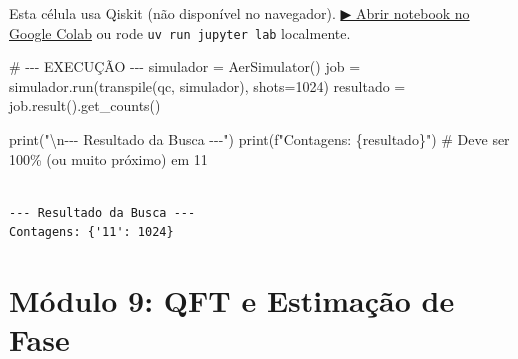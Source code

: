 \documentclass[
  brazilian,
]{report}
\newenvironment{Shaded}{\begin{snugshade}}{\end{snugshade}}
\newcommand{\BuiltInTok}[1]{\textcolor[rgb]{0.00,0.23,0.31}{#1}}
\newcommand{\CharTok}[1]{\textcolor[rgb]{0.13,0.47,0.30}{#1}}
\newcommand{\CommentTok}[1]{\textcolor[rgb]{0.37,0.37,0.37}{#1}}
\newcommand{\DecValTok}[1]{\textcolor[rgb]{0.68,0.00,0.00}{#1}}
\newcommand{\NormalTok}[1]{\textcolor[rgb]{0.00,0.23,0.31}{#1}}
\newcommand{\OperatorTok}[1]{\textcolor[rgb]{0.37,0.37,0.37}{#1}}
\newcommand{\SpecialCharTok}[1]{\textcolor[rgb]{0.37,0.37,0.37}{#1}}
\newcommand{\SpecialStringTok}[1]{\textcolor[rgb]{0.13,0.47,0.30}{#1}}
\newcommand{\StringTok}[1]{\textcolor[rgb]{0.13,0.47,0.30}{#1}}
\begin{document}
\begin{tcolorbox}[enhanced jigsaw, arc=.35mm, bottomrule=.15mm, bottomtitle=1mm, breakable, colback=white, colbacktitle=quarto-callout-warning-color!10!white, colframe=quarto-callout-warning-color-frame, coltitle=black, left=2mm, leftrule=.75mm, opacityback=0, opacitybacktitle=0.6, rightrule=.15mm, title=\textcolor{quarto-callout-warning-color}{\faExclamationTriangle}\hspace{0.5em}{⚛️ Célula Qiskit --- execute no Colab ou localmente}, titlerule=0mm, toprule=.15mm, toptitle=1mm]

Esta célula usa Qiskit (não disponível no navegador).
\href{https://colab.research.google.com/github/maxwellamaral/aula-quantum/blob/main/notebooks/06-grover.ipynb}{▶
Abrir notebook no Google Colab} ou rode \texttt{uv\ run\ jupyter\ lab}
localmente.

\begin{Shaded}
\begin{Highlighting}[]

\CommentTok{\# {-}{-}{-} EXECUÇÃO {-}{-}{-}}
\NormalTok{simulador }\OperatorTok{=}\NormalTok{ AerSimulator()}
\NormalTok{job }\OperatorTok{=}\NormalTok{ simulador.run(transpile(qc, simulador), shots}\OperatorTok{=}\DecValTok{1024}\NormalTok{)   }
\NormalTok{resultado }\OperatorTok{=}\NormalTok{ job.result().get\_counts()}

\BuiltInTok{print}\NormalTok{(}\StringTok{"}\CharTok{\textbackslash{}n}\StringTok{{-}{-}{-} Resultado da Busca {-}{-}{-}"}\NormalTok{)}
\BuiltInTok{print}\NormalTok{(}\SpecialStringTok{f"Contagens: }\SpecialCharTok{\{}\NormalTok{resultado}\SpecialCharTok{\}}\SpecialStringTok{"}\NormalTok{)}
\CommentTok{\# Deve ser 100\% (ou muito próximo) em \textquotesingle{}11\textquotesingle{}}
\end{Highlighting}
\end{Shaded}

\end{tcolorbox}

\begin{verbatim}

--- Resultado da Busca ---
Contagens: {'11': 1024}
\end{verbatim}

\newpage

\chapter{Módulo 9: QFT e Estimação de
Fase}\label{muxf3dulo-9-qft-e-estimauxe7uxe3o-de-fase}
\end{document}

